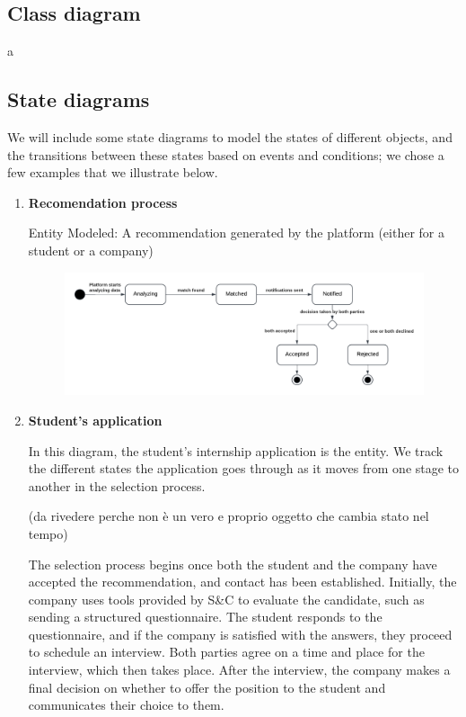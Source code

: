 \subsection{Class diagram}
a

\subsection{State diagrams}
We will include some state diagrams to model the states of different objects, and the transitions between these states based on events and conditions; we chose a few examples that we illustrate below.
\begin{enumerate}

\item \textbf{Recomendation process}

Entity Modeled: A recommendation generated by the platform (either for a student or a company)


\begin{figure}[H]
    \centering
    \includegraphics[width=1\linewidth]{RASD//Images/Recomendation.png}
    \caption{}
    \label{fig:enter-label}
\end{figure}

\item \textbf{Student's application}

In this diagram, the student's internship application is the entity. We track the different states the application goes through as it moves from one stage to another in the selection process.

(da rivedere perche non è un vero e proprio oggetto che cambia stato nel tempo)

The selection process begins once both the student and the company have accepted the recommendation, and contact has been established. Initially, the company uses tools provided by S\&C to evaluate the candidate, such as sending a structured questionnaire. The student responds to the questionnaire, and if the company is satisfied with the answers, they proceed to schedule an interview. Both parties agree on a time and place for the interview, which then takes place. After the interview, the company makes a final decision on whether to offer the position to the student and communicates their choice to them.


\end{enumerate}
